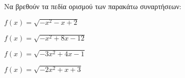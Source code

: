 Να βρεθούν τα πεδία ορισμού των παρακάτω συναρτήσεων:
\begin{alist}
\item $ f(x)=\sqrt{-x^2-x+2} $
\item $ f(x)=\sqrt{-x^2+8x-12} $
\item $ f(x)=\sqrt{-3x^2+4x-1} $
\item $ f(x)=\sqrt{-2x^2+x+3} $
\end{alist}
